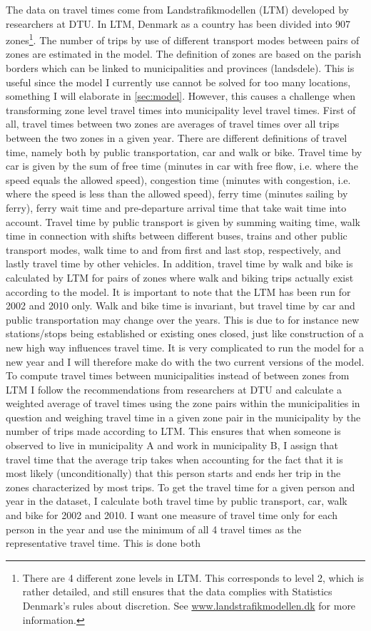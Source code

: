 The data on travel times come from Landstrafikmodellen (LTM) developed by researchers at DTU. In LTM, Denmark as a country has been divided into 907 zones\footnote{There are 4 different zone levels in LTM. This corresponds to level 2, which is rather detailed, and still ensures that the data complies with Statistics Denmark's rules about discretion. See \url{www.landstrafikmodellen.dk} for more information.}. The number of trips by use of different transport modes between pairs of zones are estimated in the model. The definition of zones are based on the parish borders which can be linked to municipalities and provinces (landsdele). This is useful since the model I currently use cannot be solved for too many locations, something I will elaborate in \autoref{sec:model}. However, this causes a challenge when transforming zone level travel times into municipality level travel times. First of all, travel times between two zones are averages of travel times over all trips between the two zones in a given year. There are different definitions of travel time, namely both by public transportation, car and walk or bike. Travel time by car is given by the sum of free time (minutes in car with free flow, i.e. where the speed equals the allowed speed), congestion time (minutes with congestion, i.e. where the speed is less than the allowed speed), ferry time (minutes sailing by ferry), ferry wait time and pre-departure arrival time that take wait time into account. Travel time by public transport is given by summing waiting time, walk time in connection with shifts between different buses, trains and other public transport modes, walk time to and from first and last stop, respectively, and lastly travel time by other vehicles. In addition, travel time by walk and bike is calculated by LTM for pairs of zones where walk and biking trips actually exist according to the model. It is important to note that the LTM has been run for 2002 and 2010 only. Walk and bike time is invariant, but travel time by car and public transportation may change over the years. This is due to for instance new stations/stops being established or existing ones closed, just like construction of a new high way influences travel time. It is very complicated to run the model for a new year and I will therefore make do with the two current versions of the model. To compute travel times between municipalities instead of between zones from LTM I follow the recommendations from researchers at DTU and calculate a weighted average of travel times using the zone pairs within the municipalities in question and weighing travel time in a given zone pair in the municipality by the number of trips made according to LTM. This ensures that when someone is observed to live in municipality A and work in municipality B, I assign that travel time that the average trip takes when accounting for the fact that it is most likely (unconditionally) that this person starts and ends her trip in the zones characterized by most trips. To get the travel time for a given person and year in the dataset, I calculate both travel time by public transport, car, walk and bike for 2002 and 2010. I want one measure of travel time only for each person in the year and use the minimum of all 4 travel times as the representative travel time. This is done both 